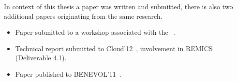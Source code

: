 In context of this thesis a paper was written and submitted,
there is also two additional papers originating from the same research.

\begin{itemize}
  \item
    Paper submitted to a workshop associated with the ~\cite{ecmfa4clouda}.
  \item
    Technical report submitted to Cloud'12~\cite{remics_4_1}, 
    involvement in REMICS (Deliverable 4.1).
  \item
    Paper published to BENEVOL'11~\cite{mosser-brandtzæg-etal:2011}.
\end{itemize}

